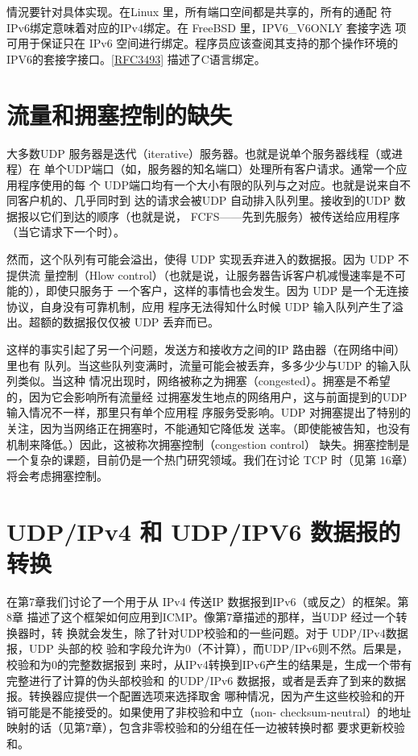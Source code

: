 \begin{tcolorbox}
    情況要针对具体实现。在Linux 里，所有端口空间都是共享的，所有的通配
    符 IPv6绑定意味着对应的IPv4绑定。在 FreeBSD 里，IPV6\_V6ONLY 套接字选
    项可用于保证只在 IPv6 空间进行绑定。程序员应该查阅其支持的那个操作环境的
    IPV6的套接字接口。\href{https://www.rfc-editor.org/rfc/rfc3493}{[RFC3493]} 描述了C语言绑定。
\end{tcolorbox}

\section{流量和拥塞控制的缺失}

大多数UDP 服务器是迭代（iterative）服务器。也就是说单个服务器线程（或进程）在
单个UDP端口（如，服务器的知名端口）处理所有客户请求。通常一个应用程序使用的每
个 UDP端口均有一个大小有限的队列与之对应。也就是说来自不同客户机的、几乎同时到
达的请求会被UDP 自动排入队列里。接收到的UDP 数据报以它们到达的顺序（也就是说，
FCFS——先到先服务）被传送给应用程序（当它请求下一个时）。

然而，这个队列有可能会溢出，使得 UDP 实现丢弃进入的数据报。因为 UDP 不提供流
量控制（Hlow control）（也就是说，让服务器告诉客户机减慢速率是不可能的），即使只服务于
一个客户，这样的事情也会发生。因为 UDP 是一个无连接协议，自身没有可靠机制，应用
程序无法得知什么时候 UDP 输入队列产生了溢出。超额的数据报仅仅被 UDP 丢弃而已。

这样的事实引起了另一个问题，发送方和接收方之间的IP 路由器（在网络中间）里也有
队列。当这些队列变满时，流量可能会被丢弃，多多少少与UDP 的输入队列类似。当这种
情况出现时，网络被称之为拥塞（congested）。拥塞是不希望的，因为它会影响所有流量经
过拥塞发生地点的网络用户，这与前面提到的UDP 输入情况不一样，那里只有单个应用程
序服务受影响。UDP 对拥塞提出了特别的关注，因为当网络正在拥塞时，不能通知它降低发
送率。（即使能被告知，也没有机制来降低。）因此，这被称次拥塞控制（congestion control）
缺失。拥塞控制是一个复杂的课题，目前仍是一个热门研究领域。我们在讨论 TCP 时（见第
16章）将会考虑拥塞控制。

\section{UDP/IPv4 和 UDP/IPV6 数据报的转换}
在第7章我们讨论了一个用于从 IPv4 传送IP 数据报到IPv6（或反之）的框架。第8章
描述了这个框架如何应用到ICMP。像第7章描述的那样，当UDP 经过一个转换器时，转
换就会发生，除了针对UDP校验和的一些问题。对于 UDP/IPv4数据报，UDP 头部的校
验和字段允许为0（不计算），而UDP/IPv6则不然。后果是，校验和为0的完整数据报到
来时，从IPv4转换到IPv6产生的结果是，生成一个带有完整进行了计算的伪头部校验和
的UDP/IPv6 数据报，或者是丢弃了到来的数据报。转换器应提供一个配置选项来选择取舍
哪种情况，因为产生这些校验和的开销可能是不能接受的。如果使用了非校验和中立（non-
checksum-neutral）的地址映射的话（见第7章），包含非零校验和的分组在任一边被转换时都
要求更新校验和。

